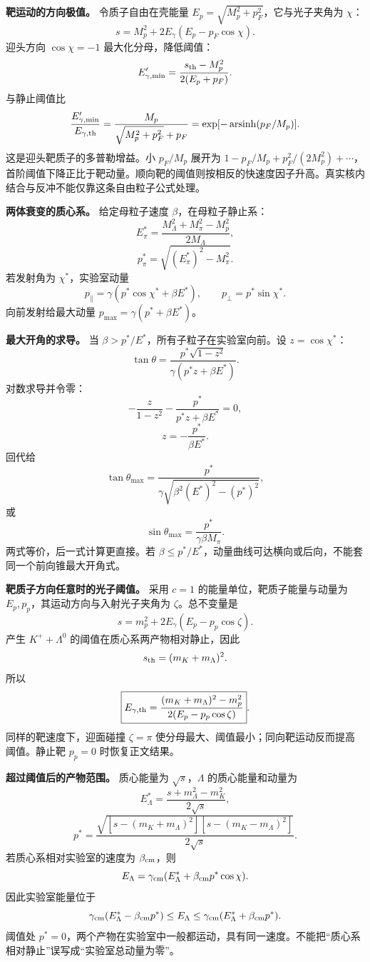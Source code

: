 \documentclass[12pt,a4paper,UTF8]{ctexart}
\begin{document}
\textbf{靶运动的方向极值。} 令质子自由在壳能量
\(E_p=\sqrt{M_p^2+p_F^2}\)，它与光子夹角为 \(\chi\)： \[
s=M_p^2+2E_\gamma(E_p-p_F\cos\chi).
\] 迎头方向 \(\cos\chi=-1\) 最大化分母，降低阈值： \[
E'_{\gamma,\min}=\frac{s_{\rm th}-M_p^2}{2(E_p+p_F)}.
\] 与静止阈值比 \[
\frac{E'_{\gamma,\min}}{E_{\gamma,\rm th}}=
\frac{M_p}{\sqrt{M_p^2+p_F^2}+p_F}
=\exp[-\operatorname{arsinh}(p_F/M_p)].
\] 这是迎头靶质子的多普勒增益。小 \(p_F/M_p\) 展开为
\(1-p_F/M_p+p_F^2/(2M_p^2)+\cdots\)，首阶阈值下降正比于靶动量。顺向靶的阈值则按相反的快速度因子升高。真实核内结合与反冲不能仅靠这条自由粒子公式处理。

\textbf{两体衰变的质心系。} 给定母粒子速度 \(\beta\)，在母粒子静止系：
\[
E_\pi^*=\frac{M_\Lambda^2+M_\pi^2-M_p^2}{2M_\Lambda},
\] \[
p_\pi^*=\sqrt{(E_\pi^*)^2-M_\pi^2}.
\] 若发射角为 \(\chi^*\)，实验室动量 \[
p_\parallel=\gamma(p^*\cos\chi^*+\beta E^*),\qquad
p_\perp=p^*\sin\chi^*.
\] 向前发射给最大动量 \(p_{\max}=\gamma(p^*+\beta E^*)\)。

\textbf{最大开角的求导。} 当
\(\beta>p^*/E^*\)，所有子粒子在实验室向前。设 \(z=\cos\chi^*\)： \[
\tan\theta=\frac{p^*\sqrt{1-z^2}}{\gamma(p^*z+\beta E^*)}.
\] 对数求导并令零： \[
-\frac z{1-z^2}-\frac{p^*}{p^*z+\beta E^*}=0,
\] \[
z=-\frac{p^*}{\beta E^*}.
\] 回代给 \[
\tan\theta_{\max}=\frac{p^*}{\gamma\sqrt{\beta^2(E^*)^2-(p^*)^2}},
\] 或 \[
\sin\theta_{\max}=\frac{p^*}{\gamma\beta M_\pi}.
\] 两式等价，后一式计算更直接。若
\(\beta\le p^*/E^*\)，动量曲线可达横向或后向，不能套同一个前向锥最大开角式。

\textbf{靶质子方向任意时的光子阈值。} 采用 \(c=1\)
的能量单位，靶质子能量与动量为 \(E_p,p_p\)，其运动方向与入射光子夹角为
\(\zeta\)。总不变量是 \[
s=m_p^2+2E_\gamma(E_p-p_p\cos\zeta).
\] 产生 \(K^++\Lambda^0\) 的阈值在质心系两产物相对静止，因此 \[
s_{\rm th}=(m_K+m_\Lambda)^2.
\] 所以 \[
\boxed{E_{\gamma,\rm th}=
\frac{(m_K+m_\Lambda)^2-m_p^2}
{2(E_p-p_p\cos\zeta)}}.
\] 同样的靶速度下，迎面碰撞 \(\zeta=\pi\)
使分母最大、阈值最小；同向靶运动反而提高阈值。静止靶 \(p_p=0\)
时恢复正文结果。

\textbf{超过阈值后的产物范围。} 质心能量为 \(\sqrt s\)，\(\Lambda\)
的质心能量和动量为 \[
E_\Lambda^*=\frac{s+m_\Lambda^2-m_K^2}{2\sqrt s},
\] \[
p^*=\frac{\sqrt{[s-(m_K+m_\Lambda)^2]
[s-(m_K-m_\Lambda)^2]}}{2\sqrt s}.
\] 若质心系相对实验室的速度为 \(\beta_{\rm cm}\)，则 \[
E_\Lambda=\gamma_{\rm cm}
(E_\Lambda^*+\beta_{\rm cm}p^*\cos\chi).
\] 因此实验室能量位于 \[
\gamma_{\rm cm}(E_\Lambda^*-\beta_{\rm cm}p^*)
\le E_\Lambda\le
\gamma_{\rm cm}(E_\Lambda^*+\beta_{\rm cm}p^*).
\] 阈值处
\(p^*=0\)，两个产物在实验室中一般都运动，具有同一速度。不能把``质心系相对静止''误写成``实验室总动量为零''。
\end{document}
